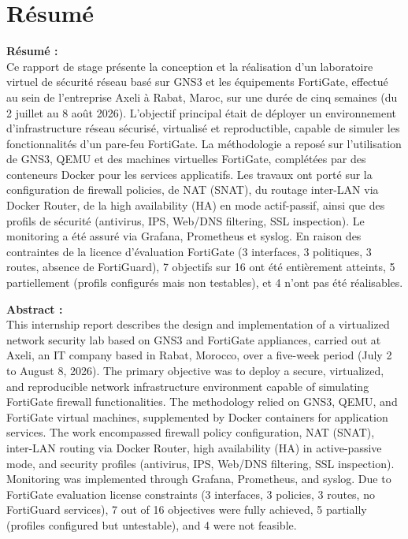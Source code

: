 \chapter*{Résumé}

\vspace{1em}
\noindent\textbf{Résumé :} \\[0.5em]
Ce rapport de stage présente la conception et la réalisation d'un laboratoire virtuel de sécurité réseau basé sur GNS3 et les équipements FortiGate, effectué au sein de l'entreprise Axeli à Rabat, Maroc, sur une durée de cinq semaines (du 2 juillet au 8 août 2026). L'objectif principal était de déployer un environnement d'infrastructure réseau sécurisé, virtualisé et reproductible, capable de simuler les fonctionnalités d'un pare-feu FortiGate. La méthodologie a reposé sur l'utilisation de GNS3, QEMU et des machines virtuelles FortiGate, complétées par des conteneurs Docker pour les services applicatifs. Les travaux ont porté sur la configuration de firewall policies, de NAT (SNAT), du routage inter-LAN via Docker Router, de la high availability (HA) en mode actif-passif, ainsi que des profils de sécurité (antivirus, IPS, Web/DNS filtering, SSL inspection). Le monitoring a été assuré via Grafana, Prometheus et syslog. En raison des contraintes de la licence d'évaluation FortiGate (3 interfaces, 3 politiques, 3 routes, absence de FortiGuard), 7 objectifs sur 16 ont été entièrement atteints, 5 partiellement (profils configurés mais non testables), et 4 n'ont pas été réalisables.

\vspace{1em}
\noindent\textbf{Abstract :} \\[0.5em]
This internship report describes the design and implementation of a virtualized network security lab based on GNS3 and FortiGate appliances, carried out at Axeli, an IT company based in Rabat, Morocco, over a five-week period (July 2 to August 8, 2026). The primary objective was to deploy a secure, virtualized, and reproducible network infrastructure environment capable of simulating FortiGate firewall functionalities. The methodology relied on GNS3, QEMU, and FortiGate virtual machines, supplemented by Docker containers for application services. The work encompassed firewall policy configuration, NAT (SNAT), inter-LAN routing via Docker Router, high availability (HA) in active-passive mode, and security profiles (antivirus, IPS, Web/DNS filtering, SSL inspection). Monitoring was implemented through Grafana, Prometheus, and syslog. Due to FortiGate evaluation license constraints (3 interfaces, 3 policies, 3 routes, no FortiGuard services), 7 out of 16 objectives were fully achieved, 5 partially (profiles configured but untestable), and 4 were not feasible.
